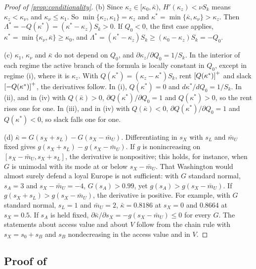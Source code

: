 \begin{proof}[Proof of \cref{prop:conditionality}]
(b) Since $\kappa_z\in[\kappa_0,\bar\kappa)$, $H'(\kappa_z)<\nu S_k$ means $\kappa_z<\kappa_\nu$, and $\kappa_\nu\le\kappa_1$. So $\min\{\kappa_z,\kappa_1\}=\kappa_z$ and $\kappa^*=\min\{\bar\kappa,\kappa_\nu\}>\kappa_z$. Then $\Lambda^*=-Q(\kappa^*)=(\kappa^*-\kappa_z)S_k>0$. If $Q_0<0$, the first case applies, $\kappa^*=\min\{\kappa_\nu,\bar\kappa\}\ge\kappa_0$, and $\Lambda^*=(\kappa^*-\kappa_z)S_k\ge(\kappa_0-\kappa_z)S_k=-Q_0$.

(c) $\kappa_1$, $\kappa_\nu$ and $\bar\kappa$ do not depend on $Q_0$, and $\partial\kappa_z/\partial Q_0=1/S_k$. In the interior of each regime the active branch of the formula is locally constant in $Q_0$, except in regime (i), where it is $\kappa_z$. With $Q(\kappa^*)=(\kappa_z-\kappa^*)S_k$, rent $\left[Q(\kappa^*)\right]^{+}$ and slack $\left[-Q(\kappa^*)\right]^{+}$, the derivatives follow. In (i), $Q(\kappa^*)=0$ and $d\kappa^*/dQ_0=1/S_k$. In (ii), and in (iv) with $Q(\bar\kappa)>0$, $\partial Q(\kappa^*)/\partial Q_0=1$ and $Q(\kappa^*)>0$, so the rent rises one for one. In (iii), and in (iv) with $Q(\bar\kappa)<0$, $\partial Q(\kappa^*)/\partial Q_0=1$ and $Q(\kappa^*)<0$, so slack falls one for one.

(d) $\bar\kappa=G(s_X+s_L)-G(s_X-\bar m_U)$. Differentiating in $s_X$ with $s_L$ and $\bar m_U$ fixed gives $g(s_X+s_L)-g(s_X-\bar m_U)$. If $g$ is nonincreasing on $[s_X-\bar m_U,s_X+s_L]$, the derivative is nonpositive; this holds, for instance, when $G$ is unimodal with its mode at or below $s_X-\bar m_U$. That Washington would almost surely defend a loyal Europe is not sufficient: with $G$ standard normal, $s_A=3$ and $s_X-\bar m_U=-4$, $G(s_A)>0.99$, yet $g(s_A)>g(s_X-\bar m_U)$. If $g(s_X+s_L)>g(s_X-\bar m_U)$, the derivative is positive. For example, with $G$ standard normal, $s_L=1$ and $\bar m_U=2$, $\bar\kappa=0.8186$ at $s_X=0$ and $0.8664$ at $s_X=0.5$. If $s_A$ is held fixed, $\partial\bar\kappa/\partial s_X=-g(s_X-\bar m_U)\le 0$ for every $G$. The statements about access value and about $V$ follow from the chain rule with $s_X=s_0+s_B$ and $s_B$ nondecreasing in the access value and in $V$.
\end{proof}

\subsection{Proof of \texorpdfstring{}{the source of assurance cost}}

